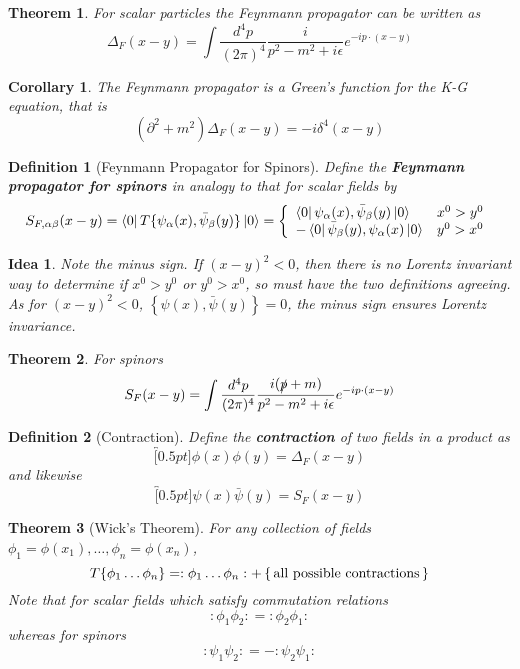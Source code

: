 \documentclass{article}
\newtheorem{theorem}{Theorem}[subsection]
\newtheorem{corollary}{Corollary}[theorem]
\newtheorem{definition}{Definition}[subsection]
\newtheorem*{idea}{Idea}
\newcommand{\eps}{\epsilon}
\newcommand{\del}{\partial}
\newcommand{\fmeas}{\frac{d^4p}{(2\pi)^4}} %
\newcommand{\bam}[1]{\textbf{#1}}
\newcommand{\acomm}[2][]{\left\{ #1, #2 \right\}} %
\begin{document}
\begin{theorem}
For scalar particles the Feynmann propagator can be written as 
\[
\Delta_F(x-y) = \int \fmeas \frac{i}{p^2-m^2+i\eps} e^{-ip\cdot(x-y)}
\]
\end{theorem}

\begin{corollary}
The Feynmann propagator is a Green's function for the K-G equation, that is 
\[
(\del^2+m^2)\Delta_F(x-y) = -i \delta^4(x-y)
\]
\end{corollary}

\begin{definition}[Feynmann Propagator for Spinors]
Define the \bam{Feynmann propagator for spinors} in analogy to that for scalar fields by 
\[
S_{F,\alpha\beta}(x-y)=\bra{0} T\{ \psi_\alpha(x), \bar{\psi}_\beta(y) \} \ket{0} = \left\{ \begin{array}{lc} \bra{0} \psi_\alpha(x), \bar{\psi}_\beta(y)  \ket{0} & x^0 > y^0 \\
    -\bra{0} \bar{\psi}_\beta(y), \psi_\alpha(x) \ket{0} & y^0 > x^0 
    \end{array} \right. \\ 
\]
\end{definition}

\begin{idea}
Note the minus sign. If $(x-y)^2 < 0$, then there is no Lorentz invariant way to determine if $x^0 > y^0$ or $y^0 > x^0$, so must have the two definitions agreeing. As for $(x-y)^2 < 0$, $\acomm[\psi(x)]{\bar{\psi}(y)}=0$, the minus sign ensures Lorentz invariance. 
\end{idea}

\begin{theorem}
For spinors 
\[
S_F(x-y) = \int \fmeas \frac{i(\slashed{p}+m)}{p^2-m^2+i\eps} e^{-ip\cdot (x-y)}
\]
\end{theorem}

\begin{definition}[Contraction]
Define the \bam{contraction} of two fields in a product as 
\[
\overbracket[0.5pt]{\phi(x)\phi(y)} = \Delta_F(x-y)
\]
and likewise 
\[
\overbracket[0.5pt]{\psi(x)\bar{\psi}(y)} = S_F(x-y)
\]
\end{definition}

\begin{theorem}[Wick's Theorem]
For any collection of fields $\phi_1 = \phi(x_1), \dots, \phi_n = \phi(x_n)$, 
\[
T \{ \phi_1 \dots \phi_n \} = :\phi_1 \dots \phi_n: + \set{\text{all possible contractions}}
\]
Note that for scalar fields which satisfy commutation relations 
\[
:\phi_1 \phi_2: = :\phi_2 \phi_1 : 
\]
whereas for spinors 
\[
:\psi_1 \psi_2: = -:\psi_2 \psi_1 : 
\]
\end{theorem}
\end{document}
